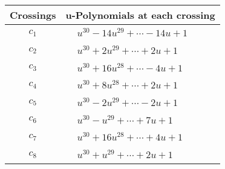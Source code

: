 \documentclass[1p]{elsarticle_modified}
\theoremstyle{definition}
\begin{document}
\begin{tabular}{m{50pt}|m{274pt}}
Crossings & \hspace{64pt}u-Polynomials at each crossing \\
\hline $$\begin{aligned}c_{1}\end{aligned}$$&$\begin{aligned}
&u^{30}-14 u^{29}+\cdots-14 u+1
\end{aligned}$\\
\hline $$\begin{aligned}c_{2}\end{aligned}$$&$\begin{aligned}
&u^{30}+2 u^{29}+\cdots+2 u+1
\end{aligned}$\\
\hline $$\begin{aligned}c_{3}\end{aligned}$$&$\begin{aligned}
&u^{30}+16 u^{28}+\cdots-4 u+1
\end{aligned}$\\
\hline $$\begin{aligned}c_{4}\end{aligned}$$&$\begin{aligned}
&u^{30}+8 u^{28}+\cdots+2 u+1
\end{aligned}$\\
\hline $$\begin{aligned}c_{5}\end{aligned}$$&$\begin{aligned}
&u^{30}-2 u^{29}+\cdots-2 u+1
\end{aligned}$\\
\hline $$\begin{aligned}c_{6}\end{aligned}$$&$\begin{aligned}
&u^{30}- u^{29}+\cdots+7 u+1
\end{aligned}$\\
\hline $$\begin{aligned}c_{7}\end{aligned}$$&$\begin{aligned}
&u^{30}+16 u^{28}+\cdots+4 u+1
\end{aligned}$\\
\hline $$\begin{aligned}c_{8}\end{aligned}$$&$\begin{aligned}
&u^{30}+u^{29}+\cdots+2 u+1
\end{aligned}$\\

\end{tabular}
\end{document}
